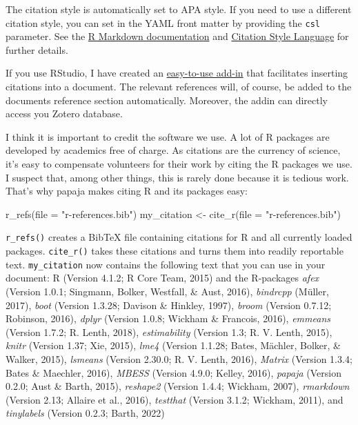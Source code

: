 \documentclass[
  man,floatsintext]{apa6}
\newenvironment{Shaded}{\begin{snugshade}}{\end{snugshade}}
\newcommand{\AttributeTok}[1]{\textcolor[rgb]{0.77,0.63,0.00}{#1}}
\newcommand{\FunctionTok}[1]{\textcolor[rgb]{0.00,0.00,0.00}{#1}}
\newcommand{\NormalTok}[1]{#1}
\newcommand{\OtherTok}[1]{\textcolor[rgb]{0.56,0.35,0.01}{#1}}
\newcommand{\StringTok}[1]{\textcolor[rgb]{0.31,0.60,0.02}{#1}}
\begin{document}
The citation style is automatically set to APA style.
If you need to use a different citation style, you can set in the YAML front matter by providing the \texttt{csl} parameter.
See the \href{https://rmarkdown.rstudio.com/authoring_bibliographies_and_citations.html}{R Markdown documentation} and \href{http://citationstyles.org/}{Citation Style Language} for further details.

If you use RStudio, I have created an \href{https://github.com/crsh/citr}{easy-to-use add-in} that facilitates inserting citations into a document.
The relevant references will, of course, be added to the documents reference section automatically.
Moreover, the addin can directly access you Zotero database.

I think it is important to credit the software we use.
A lot of R packages are developed by academics free of charge.
As citations are the currency of science, it's easy to compensate volunteers for their work by citing the R packages we use.
I suspect that, among other things, this is rarely done because it is tedious work.
That's why papaja makes citing R and its packages easy:

\begin{Shaded}
\begin{Highlighting}[]
\FunctionTok{r\_refs}\NormalTok{(}\AttributeTok{file =} \StringTok{"r{-}references.bib"}\NormalTok{)}
\NormalTok{my\_citation }\OtherTok{\textless{}{-}} \FunctionTok{cite\_r}\NormalTok{(}\AttributeTok{file =} \StringTok{"r{-}references.bib"}\NormalTok{)}
\end{Highlighting}
\end{Shaded}

\texttt{r\_refs()} creates a BibTeX file containing citations for R and all currently loaded packages.
\texttt{cite\_r()} takes these citations and turns them into readily reportable text.
\texttt{my\_citation} now contains the following text that you can use in your document: R (Version 4.1.2; R Core Team, 2015) and the R-packages \emph{afex} (Version 1.0.1; Singmann, Bolker, Westfall, \& Aust, 2016), \emph{bindrcpp} (Müller, 2017), \emph{boot} (Version 1.3.28; Davison \& Hinkley, 1997), \emph{broom} (Version 0.7.12; Robinson, 2016), \emph{dplyr} (Version 1.0.8; Wickham \& Francois, 2016), \emph{emmeans} (Version 1.7.2; R. Lenth, 2018), \emph{estimability} (Version 1.3; R. V. Lenth, 2015), \emph{knitr} (Version 1.37; Xie, 2015), \emph{lme4} (Version 1.1.28; Bates, Mächler, Bolker, \& Walker, 2015), \emph{lsmeans} (Version 2.30.0; R. V. Lenth, 2016), \emph{Matrix} (Version 1.3.4; Bates \& Maechler, 2016), \emph{MBESS} (Version 4.9.0; Kelley, 2016), \emph{papaja} (Version 0.2.0; Aust \& Barth, 2015), \emph{reshape2} (Version 1.4.4; Wickham, 2007), \emph{rmarkdown} (Version 2.13; Allaire et al., 2016), \emph{testthat} (Version 3.1.2; Wickham, 2011), and \emph{tinylabels} (Version 0.2.3; Barth, 2022)
\end{document}

